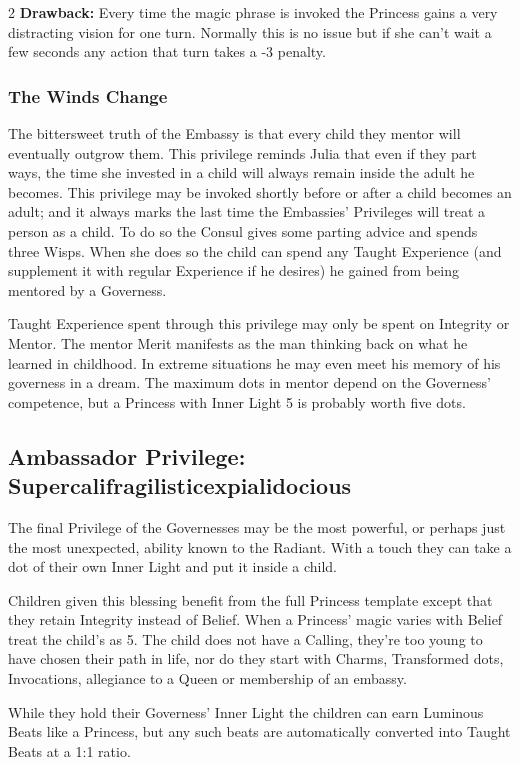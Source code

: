 \begin{multicols}{2}
\textbf{Drawback:} Every time the magic phrase is invoked the Princess gains a very distracting vision for one turn. Normally this is no issue but if she can't wait a few seconds any action that turn takes a -3 penalty.

\subsubsection*{The Winds Change}

The bittersweet truth of the Embassy is that every child they mentor will eventually outgrow them. This privilege reminds Julia that even if they part ways, the time she invested in a child will always remain inside the adult he becomes. This privilege may be invoked shortly before or after a child becomes an adult; and it always marks the last time the Embassies' Privileges will treat a person as a child. To do so the Consul gives some parting advice and spends three Wisps. When she does so the child can spend any Taught Experience (and supplement it with regular Experience if he desires) he gained from being mentored by a Governess.

Taught Experience spent through this privilege may only be spent on Integrity or Mentor. The mentor Merit manifests as the man thinking back on what he learned in childhood. In extreme situations he may even meet his memory of his governess in a dream. The maximum dots in mentor depend on the Governess' competence, but a Princess with Inner Light 5 is probably worth five dots.

\subsection*{Ambassador Privilege: Supercalifragilisticexpialidocious}

The final Privilege of the Governesses may be the most powerful, or perhaps just the most unexpected, ability known to the Radiant. With a touch they can take a dot of their own Inner Light and put it inside a child.

Children given this blessing benefit from the full Princess template except that they retain Integrity instead of Belief. When a Princess’ magic varies with Belief treat the child’s as 5. The child does not have a Calling, they’re too young to have chosen their path in life, nor do they start with Charms, Transformed dots, Invocations, allegiance to a Queen or membership of an embassy.

While they hold their Governess' Inner Light the children can earn Luminous Beats like a Princess, but any such beats are automatically converted into Taught Beats at a 1:1 ratio. 


\end{multicols}
